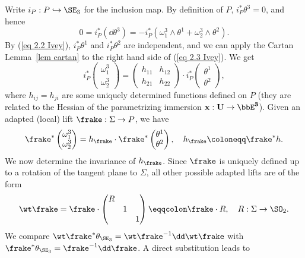 Write $i_P:P\hookrightarrow \SE_3$ for the inclusion map. By definition of $P$, $i_P^\ast\theta^3=0$, and hence 
\[0=i_P^\ast(\dd\theta^3)=-i_P^\ast(\omega_1^3\wedge\theta^1+\omega_2^3\wedge\theta^2).\label{eq 2.3 Ivey}\]
By (\ref{eq 2.2 Ivey}), $i_P^\ast\theta^1$ and $i_P^\ast\theta^2$ are independent, and we can apply the Cartan Lemma~\ref{lem cartan} to the right hand side of (\ref{eq 2.3 Ivey}). We get 
\[i_P^\ast 
\begin{pmatrix}
    \omega_1^3 \\ \omega_2^3
\end{pmatrix}
=
\begin{pmatrix}
    h_{11} & h_{12}\\ h_{21} & h_{22}
\end{pmatrix}\cdot
i_P^\ast 
\begin{pmatrix}
    \theta^1 \\ \theta^2
\end{pmatrix},\label{def h}
\]
where $h_{ij}=h_{ji}$ are some uniquely determined functions defined on $P$ (they are related to the Hessian of the parametrizing immersion $\bf{x}:U\to \bbE^3$). Given an adapted (local) lift $\frake:\Sigma\to P$, we have 
\[\frake^\ast \begin{pmatrix}
    \omega_1^3 \\ \omega_2^3
\end{pmatrix}=
h_\frake \cdot \frake^\ast \begin{pmatrix}
    \theta^1 \\ \theta^2
\end{pmatrix},\quad h_\frake\coloneqq \frake^\ast h.
\]
We now determine the invariance of $h_\frake$. Since $\frake$ is uniquely defined up to a rotation of the tangent plane to $\Sigma$, all other possible adapted lifts are of the form
\[\wt\frake=\frake\cdot\begin{pmatrix}
    R &&\\
    &1 &\\
    &&1
\end{pmatrix}\eqqcolon \frake\cdot R,\quad R:\Sigma\to \SO_2.
\]
We compare $\wt\frake^\ast \theta_{\SE_3}=\wt\frake^{-1}\dd \wt\frake$ with $\frake^\ast\theta_{\SE_3}=\frake^{-1}\dd\frake$. A direct substitution leads to 
